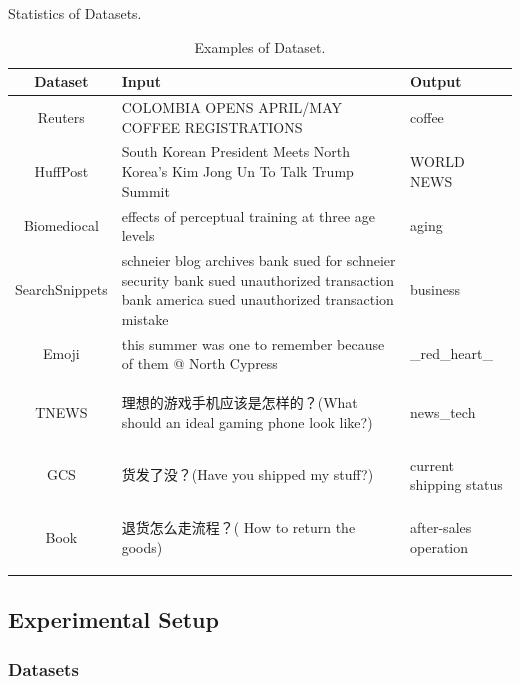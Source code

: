 \begin{table}[th]
\begin{threeparttable}
\begin{tablenotes}
\end{tablenotes}
\end{threeparttable}
\caption{Statistics of Datasets.}

\label{table:statsOfDataset}
\end{table}
\begin{table}[th]
	\small
	\centering
	\scriptsize
	\setlength{\abovecaptionskip}{0pt}
	\setlength{\belowcaptionskip}{0pt}
	\begin{tabular}{c P{11cm}P{3cm}}
	\hline
	Dataset & Input     &      Output          \\ \hline
	Reuters     & COLOMBIA OPENS APRIL/MAY COFFEE REGISTRATIONS & coffee         \\ 
	HuffPost &South Korean President Meets North Korea's Kim Jong Un To Talk Trump Summit &WORLD NEWS\\ 
	Biomediocal & effects of perceptual training at three age levels & aging \\ 
	SearchSnippets & schneier blog archives bank sued for schneier security bank sued unauthorized transaction bank america sued unauthorized transaction mistake & business\\ 
	Emoji & this summer was one to remember because of them @ North Cypress& \_red\_heart\_ \\
	TNEWS & \begin{CJK}{UTF8}{gbsn}理想的游戏手机应该是怎样的？(What should an ideal gaming phone look like?)\end{CJK} & news\_tech \\ 
	GCS     & \begin{CJK}{UTF8}{gbsn}货发了没？(Have you shipped my stuff?)\end{CJK} &  current shipping status      \\ 
	Book & \begin{CJK}{UTF8}{gbsn}退货怎么走流程？(
		How to return the goods)\end{CJK}	&  after-sales operation \\ \hline
	
	\end{tabular}
	\caption{Examples of Dataset.}
	\label{table:exampleOfDataset}
	\end{table}

\subsection{Experimental Setup}
\subsubsection{Datasets} 

